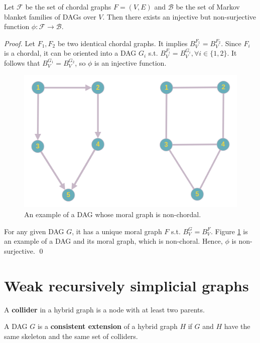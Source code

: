 \begin{proposition}
Let $\mathcal{F}$ be the set of chordal graphs $F=(V,E)$ and $\mathcal{B}$ be the set of Markov blanket families of DAGs over $V$. Then there exists an injective but non-surjective function $\phi: \mathcal{F} \rightarrow \mathcal{B}$. 
\end{proposition}
\begin{proof}
Let $F_1, F_2$ be two identical chordal graphs. It implies $B_V^{F_1} = B_V^{F_2}$. Since $F_i$ is a chordal, it can be oriented into a DAG $G_i$ s.t. $B_V^{F_i} = B_V^{G_i}, \forall i \in \{1,2\}$. It follows that $B_V^{G_1}=B_V^{G_2}$, so $\phi$ is an injective function. 
\begin{figure}[H]
  \centering
    \includegraphics[scale=0.3]{wrs_non_chordal_example.png}
  \caption{An example of a DAG whose moral graph is non-chordal.}
  \label{fg:wrs_non_chordal}
\end{figure}
For any given DAG $G$, it has a unique moral graph $F$ s.t. $B_V^G=B_V^F$. Figure \ref{fg:wrs_non_chordal} is an example of a DAG and its moral graph, which is non-choral. Hence, $\phi$ is non-surjective. \qed
\end{proof}

\section{Weak recursively simplicial graphs}
\begin{definition}
\label{def:collider}
A \textbf{collider} in a hybrid graph is a node with at least two parents. 
\end{definition}

\begin{definition}
\label{def:consistent_ext}
A DAG $G$ is a \textbf{consistent extension} of a hybrid graph $H$ if $G$ and $H$ have the same skeleton and the same set of colliders. 
\end{definition}


